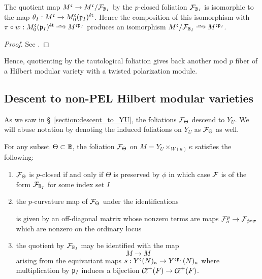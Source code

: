 \documentclass[main.tex]{subfiles}
\begin{document}
{\begin{theorem} \label{thm:foliation_quotient}
The quotient map $M^{\mathfrak{c}} \to M^{\mathfrak{c}}/\mathcal{F}_{\mathbb{B}_I}$ by the $p$-closed foliation $\mathcal{F}_{\mathbb{B}_I}$ is isomorphic to the map $\theta_I : M^{\mathfrak{c}} \to M^{\mathfrak{c}}_0(\mathfrak{p}_I)^{\mathrm{\acute{e}t}}$. Hence the composition of this isomorphism with $\pi \circ w : M^{\cc}_0(\p_I)^{\et} \iso M^{\cc \p_I}$ produces an isomorphism $M^{\cc}/\F_{\BB_I} \iso M^{\cc \p_I}$.
\end{theorem}

\begin{proof}
See \cite[Theorem 3.2.2 and Proposition 3.3.3]{goren_deshalit:foliations_shimura}.
\end{proof}

Hence, quotienting by the tautological foliation gives back another mod $p$ fiber of a Hilbert modular variety with a twisted polarization module.  

\subsection{Descent to non-PEL Hilbert modular varieties}

As we saw in \S~\ref{section:descent_to_YU}, the foliations $\mathcal{F}_{\Theta}$ descend to $Y_U$. We will abuse notation by denoting the induced foliations on $Y_U$ as $\mathcal{F}_{\Theta}$ as well. 

\begin{theorem} \label{thm:YU_foliations}
For any subset $\Theta \subset \mathbb{B}$, the foliation $\mathcal{F}_{\Theta}$ on $M = Y_U \times_{W(\kappa)} \kappa$ satisfies the following:
\begin{enumerate}
\item $\mathcal{F}_{\Theta}$ is $p$-closed if and only if $\Theta$ is preserved by $\phi$ in which case $\mathcal{F}$ is of the form $\mathcal{F}_{\mathbb{B}_I}$ for some index set $I$
\item the $p$-curvature map of $\mathcal{F}_{\Theta}$ under the identifications
\begin{center}
\end{center}
is given by an off-diagonal matrix whose nonzero terms are maps $\mathcal{F}_{\sigma}^{p} \to \mathcal{F}_{\phi \circ \sigma}$ which are nonzero on the ordinary locus
\item the quotient by $\mathcal{F}_{\mathbb{B}_I}$ may be identified with the map
\[ M \to M \]
arising from the equivariant maps $s : Y^{\mathfrak{c}}(N)_{\kappa} \to Y^{\mathfrak{c} \mathfrak{p}_I}(N)_{\kappa}$ where multiplication by $\mathfrak{p}_I$ induces a bijection $\operatorname{\mathcal{C}\!{\ell}}^+(F) \to \operatorname{\mathcal{C}\!{\ell}}^+(F)$. 
\end{enumerate}
\end{theorem}

}
\end{document}
